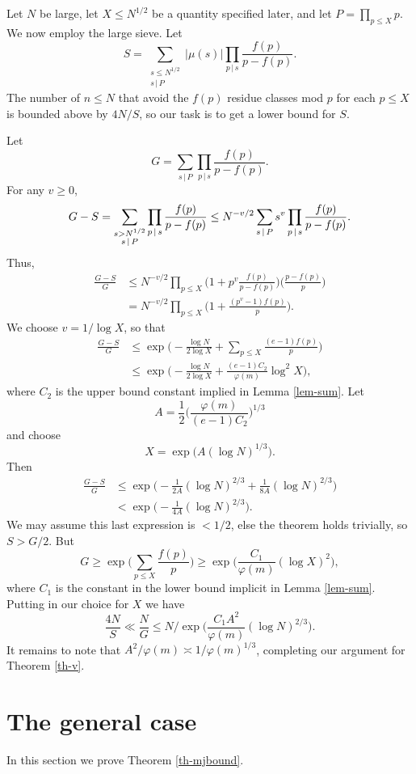 \documentclass[12pt]{amsart}
\theoremstyle{definition}
\theoremstyle{remark}
\numberwithin{equation}{section}
\begin{document}
 Let $N$ be large, let $X\le N^{1/2}$ be a quantity specified later, and let $P=\prod_{p\le X}p$.
We now employ the large sieve.  Let
\[
S=\sum_{\substack{s\le N^{1/2}\\s\,|\,P}}|\mu(s)|\prod_{p\,|\,s}\frac{f(p)}{p-f(p)}.
\]
The number of $n\le N$ that avoid the $f(p)$ residue classes mod $p$ for each $p\le X$
is bounded above by $4N/S$, so our task is to get a lower bound for $S$.

 Let 
\[
G=\sum_{s\,|\,P}\prod_{p\,|\,s}\frac{f(p)}{p-f(p)}.
\]
For any $v\ge0$,
\[
G-S=\sum_{\substack{s>N^{1/2}\\s\,|\,P}}\prod_{p\,|\,s}\frac{f(p)}{p-f(p)}\\
\le N^{-v/2}\sum_{s\,|\,P}s^v\prod_{p\,|\,s}\frac{f(p)}{p-f(p)}.
\]
Thus,
\begin{align*}
\frac{G-S}G&\le N^{-v/2}\prod_{p\le X}\Big(1+p^v\frac{f(p)}{p-f(p)}\Big)\Big(\frac{p-f(p)}{p}\Big)\\
&= N^{-v/2}\prod_{p\le X}\Big(1+\frac{(p^v-1)f(p)}{p}\Big).
\end{align*}
We choose $v=1/\log X$, so that
\begin{align*}
\frac{G-S}G&\le\exp\Big(-\frac{\log N}{2\log X}+\sum_{p\le X}\frac{(e-1)f(p)}p\Big)\\
&\le\exp\Big(-\frac{\log N}{2\log X}+\frac{(e-1)C_2}{\varphi(m)}\log^2X\Big),
\end{align*}
where $C_2$ is the upper bound constant  implied in Lemma \ref{lem-sum}.
Let
\[
A=\frac12\Big(\frac{\varphi(m)}{(e-1)C_2}\Big)^{1/3}
\]
and choose 
\[
X=\exp\big(A(\log N)^{1/3}\big).
\]
Then
\begin{align*}
\frac{G-S}{G}&\le\exp\Big(-\frac1{2A}(\log N)^{2/3}+\frac1{8A}(\log N)^{2/3}\Big)\\
&<\exp\Big(-\frac1{4A}(\log N)^{2/3}\Big).
\end{align*}
We may assume this last expression is $<1/2$, else the theorem holds trivially, so
 $S> G/2$.  But
\[
G\ge \exp\Big(\sum_{p\le X}\frac{f(p)}p\Big)\ge\exp\Big(\frac{C_1}{\varphi(m)}(\log X)^2\Big),
\]
where $C_1$ is the constant in the lower bound implicit in Lemma \ref{lem-sum}.
Putting in our choice for $X$ we have
\[
\frac{4N}{S}\ll \frac NG\le N/\exp\Big(\frac{C_1A^2}{\varphi(m)}(\log N)^{2/3}\Big).
\]
It remains to note that $A^2/\varphi(m)\asymp1/\varphi(m)^{1/3}$, completing
our argument for Theorem \ref{th-v}.


\section{The general case}
In this section we prove Theorem \ref{th-mjbound}.
\end{document}
